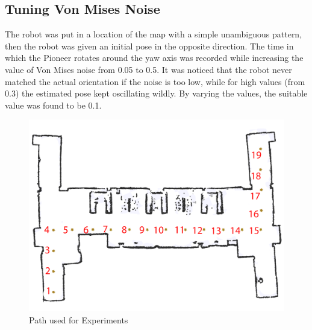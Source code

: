 \documentclass[a4paper, 10pt, conference]{ieeeconf}      %
\begin{document}
\subsection{Tuning Von Mises Noise}
The robot was put in a location of the map with a simple unambiguous pattern, then the robot was given an initial pose in the opposite direction. The time in which the Pioneer rotates around the yaw axis was recorded while increasing the value of Von Mises noise from 0.05 to 0.5. It was noticed that the robot never matched the actual orientation if the noise is too low, while for high values (from 0.3) the estimated pose kept oscillating wildly. By varying the values, the suitable value was found to be 0.1.

\begin{figure}[b]
\centering
\captionsetup{justification=centering}
\includegraphics[scale=0.35]{ex2path}
\caption{Path used for Experiments}
\label{fig:map}
\end{figure}
\end{document}
